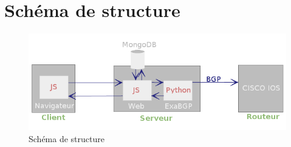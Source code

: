 \section{Schéma de structure}

\begin{figure}[h]
\includegraphics[scale = 0.75]{img/Schema_de_structure.png}
\caption{Schéma de structure}
\end{figure}